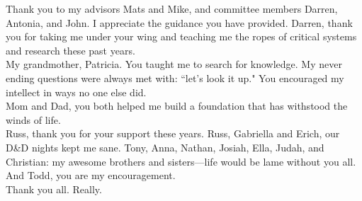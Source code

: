 
Thank you to my advisors Mats and Mike, and committee members Darren, Antonia, and John. I appreciate the guidance you have provided. Darren, thank you for taking me under your wing and teaching me the ropes of critical systems and research these past years.\\

My grandmother, Patricia. You taught me to search for knowledge.  My never ending questions were always met with: ``let's look it up." You encouraged my intellect in ways no one else did. \\

Mom and Dad, you both helped me build a foundation that has withstood the winds of life. \\

Russ, thank you for your support these years. Russ, Gabriella and Erich, our D\&D nights kept me sane. Tony, Anna, Nathan, Josiah, Ella, Judah, and Christian: my awesome brothers and sisters---life would be lame without you all. And Todd, you are my encouragement. \\

Thank you all. Really. 


